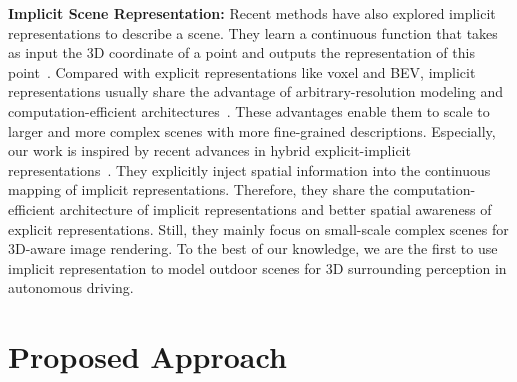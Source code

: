 \documentclass[10pt,twocolumn,letterpaper]{article}
\begin{document}
\textbf{Implicit Scene Representation:}
Recent methods have also explored implicit representations to describe a scene.
They learn a continuous function that takes as input the 3D coordinate of a point and outputs the representation of this point~\cite{mescheder2019occupancy,nerf,deepsdf}.
Compared with explicit representations like voxel and BEV, implicit representations usually share the advantage of arbitrary-resolution modeling and computation-efficient architectures~\cite{chabra2020deep,chen2021learning,reiser2021kilonerf}.
These advantages enable them to scale to larger and more complex scenes with more fine-grained descriptions. 
Especially, our work is inspired by recent advances in hybrid explicit-implicit representations~\cite{triplane,tensorf}.
They explicitly inject spatial information into the continuous mapping of implicit representations.
Therefore, they share the computation-efficient architecture of implicit representations and better spatial awareness of explicit representations.
Still, they mainly focus on small-scale complex scenes for 3D-aware image rendering.
To the best of our knowledge, we are the first to use implicit representation to model outdoor scenes for 3D surrounding perception in autonomous driving. \section{Proposed Approach}
\end{document}
